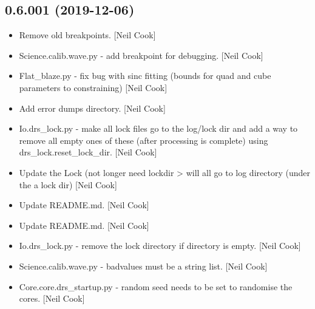 \documentclass[a4paper,10pt,english]{report}
\begin{document}
\subsection{0.6.001 (2019-12-06)}
\label{\detokenize{misc/changelog:id16}}\begin{itemize}
\item {} 
Remove old breakpoints. {[}Neil Cook{]}

\item {} 
Science.calib.wave.py - add breakpoint for debugging. {[}Neil Cook{]}

\item {} 
Flat\_blaze.py - fix bug with sinc fitting (bounds for quad and cube
parameters to constraining) {[}Neil Cook{]}

\item {} 
Add error dumps directory. {[}Neil Cook{]}

\item {} 
Io.drs\_lock.py - make all lock files go to the log/lock dir and add a
way to remove all empty ones of these (after processing is complete)
using drs\_lock.reset\_lock\_dir. {[}Neil Cook{]}

\item {} 
Update the Lock (not longer need lockdir \textendash{}\textgreater{} will all go to log
directory (under the a lock dir) {[}Neil Cook{]}

\item {} 
Update README.md. {[}Neil Cook{]}

\item {} 
Update README.md. {[}Neil Cook{]}

\item {} 
Io.drs\_lock.py - remove the lock directory if directory is empty.
{[}Neil Cook{]}

\item {} 
Science.calib.wave.py - badvalues must be a string list. {[}Neil Cook{]}

\item {} 
Core.core.drs\_startup.py - random seed needs to be set to randomise
the cores. {[}Neil Cook{]}

\end{itemize}
\end{document}
